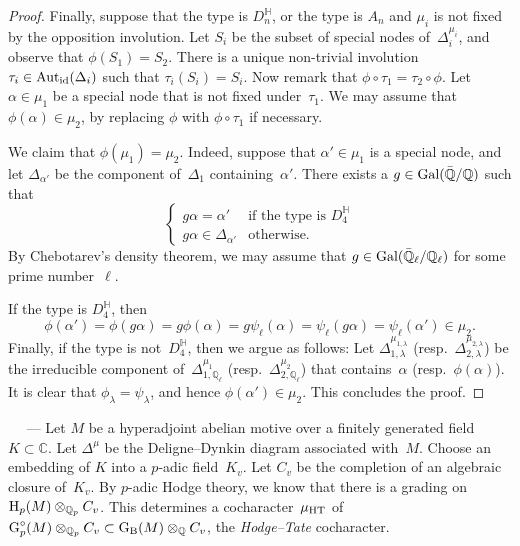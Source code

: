\documentclass[10pt,twoside,leqno]{article}
\renewcommand{\paragraph}[1]{\par\bigskip\refstepcounter{subsection}%
 {\normalfont\normalsize\scshape\noindent\thesubsection%
 \ifthenelse{\equal{#1}{}}%
 {}%
 {\ \textls{#1.}}%
 \ ---}%
}
\numberwithin{equation}{subsection}
\newcommand{\id}{\textnormal{id}}
\newcommand{\Aut}{\textnormal{Aut}}
\newcommand{\QQ}{\mathbb{Q}}
\newcommand{\QQbar}{\bar{\QQ}}
\newcommand{\QQl}{\QQ_{\ell}}
\newcommand{\QQlbar}{\QQbar_{\ell}}
\newcommand{\QQp}{\QQ_{p}}
\newcommand{\CC}{\mathbb{C}}
\newcommand{\HQ}{\mathbb{H}}
\newcommand{\Gal}{\textnormal{Gal}}
\newcommand{\HT}{\textnormal{HT}}
\newcommand{\HH}{\textnormal{H}}
\newcommand{\Hp}{\HH_{p}}
\newcommand{\GG}{\textnormal{G}}
\newcommand{\GB}{\GG_{\textnormal{B}}}
\newcommand{\Gp}{\GG_{p}}
\newcommand{\Gpc}{\Gp^{\circ}}
\begin{document}
\begin{proposition}
\begin{proof}
  Finally, suppose that the type is $D_n^\HQ$,
  or the type is $A_n$ and $\mu_i$ is not fixed by the opposition involution.
  Let $S_i$ be the subset of special nodes of~$\Delta_i^{\mu_i}$,
  and observe that $\phi(S_1) = S_2$.
  There is a unique non-trivial involution~$\tau_i \in \Aut_\id(\Delta_i)$
  such that $\tau_i(S_i) = S_i$.
  Now remark that $\phi \circ \tau_1 = \tau_2 \circ \phi$.
  Let $\alpha \in \mu_1$ be a special node that is not fixed under~$\tau_1$.
  We may assume that $\phi(\alpha) \in \mu_2$,
  by replacing $\phi$ with $\phi \circ \tau_1$ if necessary.
  
  We claim that $\phi(\mu_1) = \mu_2$.
  Indeed, suppose that $\alpha' \in \mu_1$ is a special node, and
  let $\Delta_{\alpha'}$ be the component of~$\Delta_1$ containing~$\alpha'$.
  There exists a $g \in \Gal(\QQbar/\QQ)$ such that
  \[
   \begin{cases}
    g\alpha = \alpha' &\text{if the type is~$D_4^\HQ$}\\
    g\alpha \in \Delta_{\alpha'} &\text{otherwise.}
   \end{cases}
  \]
  By Chebotarev's density theorem,
  we may assume that $g \in \Gal(\QQlbar/\QQl)$
  for some prime number~$\ell$.

  If the type is $D_4^\HQ$, then
  \[
   \phi(\alpha') = \phi(g\alpha) = g\phi(\alpha) = g\psi_\ell(\alpha)
   = \psi_\ell(g\alpha) = \psi_\ell(\alpha') \in \mu_2.
  \]
  Finally, if the type is not~$D_4^\HQ$, then we argue as follows:
  Let $\Delta_{1,\lambda}^{\mu_{1,\lambda}}$
  (resp.~$\Delta_{2,\lambda}^{\mu_{2,\lambda}}$)
  be the irreducible component of~$\Delta_{1,\QQl}^{\mu_1}$
  (resp.\ $\Delta_{2,\QQl}^{\mu_2}$)
  that contains~$\alpha$ (resp.~$\phi(\alpha)$).
  It is clear that $\phi_\lambda = \psi_\lambda$,
  and hence $\phi(\alpha') \in \mu_2$.
  This concludes the proof.
 \end{proof}
\end{proposition}

\paragraph{} %
Let $M$ be a hyperadjoint abelian motive
over a finitely generated field $K \subset \CC$.
Let $\Delta^\mu$ be the Deligne--Dynkin diagram associated with~$M$.
Choose an embedding of $K$ into a $p$-adic field~$K_v$.
Let $C_v$ be the completion of an algebraic closure of~$K_v$.
By $p$-adic Hodge theory,
we know that there is a grading on $\Hp(M) \otimes_{\QQp} C_v$.
This determines a cocharacter~$\mu_{\HT}$ of
$\Gpc(M) \otimes_{\QQp} C_v \subset \GB(M) \otimes_\QQ C_v$,
the \emph{Hodge--Tate} cocharacter.
\end{document}
